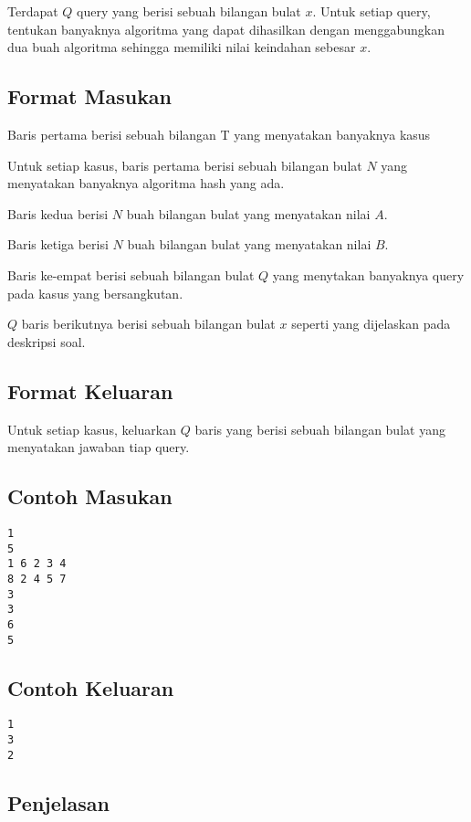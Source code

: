 \documentclass{article}
\begin{document}
\par Terdapat $Q$ query yang berisi sebuah bilangan bulat $x$. Untuk setiap query, tentukan banyaknya algoritma yang dapat dihasilkan dengan menggabungkan dua buah algoritma sehingga memiliki nilai keindahan sebesar $x$.

\subsection*{Format Masukan}
\par Baris pertama berisi sebuah bilangan T yang menyatakan banyaknya kasus
\par Untuk setiap kasus, baris pertama berisi sebuah bilangan bulat $N$ yang menyatakan banyaknya algoritma hash yang ada.
\par Baris kedua berisi $N$ buah bilangan bulat yang menyatakan nilai $A$.
\par Baris ketiga berisi $N$ buah bilangan bulat yang menyatakan nilai $B$.
\par Baris ke-empat berisi sebuah bilangan bulat $Q$ yang menytakan banyaknya query pada kasus yang bersangkutan.
\par $Q$ baris berikutnya berisi sebuah bilangan bulat $x$ seperti yang dijelaskan pada deskripsi soal.

\subsection*{Format Keluaran}

\par Untuk setiap kasus, keluarkan $Q$ baris yang berisi sebuah bilangan bulat yang menyatakan jawaban tiap query.

\subsection*{Contoh Masukan}

\begin{lstlisting}
1
5
1 6 2 3 4
8 2 4 5 7
3
3
6
5
\end{lstlisting}

\subsection*{Contoh Keluaran}

\begin{lstlisting}
1
3
2
\end{lstlisting}

\subsection*{Penjelasan}
\end{document}
